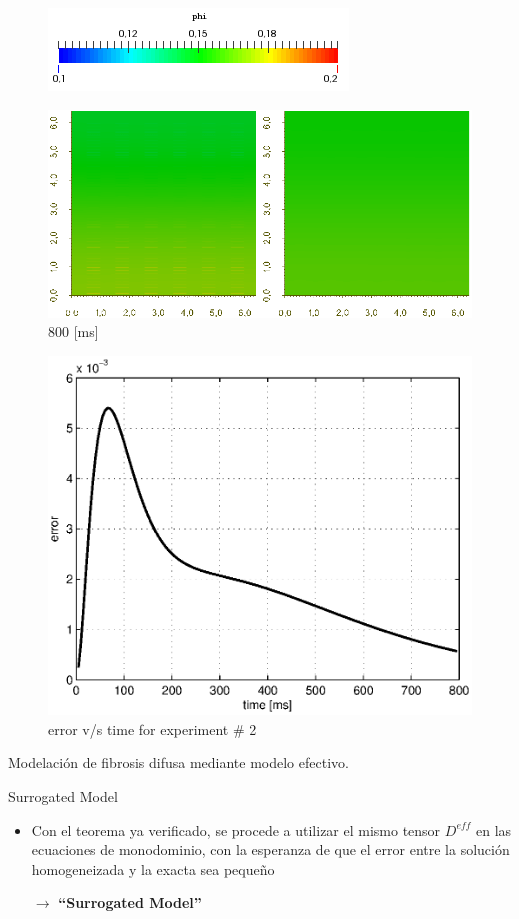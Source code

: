 \documentclass[11pt,spanish]{beamer}
\begin{document}
\begin{frame}
\begin{figure}[H]
\centering
\includegraphics[height = 0.9 cm]{fig/theorem_verification_r2_exp2_colorbar}
\end{figure}
\begin{figure}[H]
\centering
\includegraphics[height = 5 cm]{fig/theorem_verification_r2_exp2_800ms}
\caption{800 [ms]}
\end{figure}
\end{frame}

\begin{frame}
\begin{figure}[H]
\centering
\includegraphics[height = 6 cm]{fig/theorem_verification_r2_exp2_error}
\caption{error v/s time for experiment \# 2}
\end{figure}
\end{frame}

\begin{frame}
\begin{center}
\Huge Modelación de fibrosis difusa mediante modelo efectivo.
\end{center}
\end{frame}

\begin{frame}{Surrogated Model}
\begin{itemize}
\item Con el teorema ya verificado, se procede a utilizar el mismo tensor $D^{eff}$ en las ecuaciones de monodominio, con la esperanza de que el error entre la solución homogeneizada y la exacta sea pequeño \\
\begin{center}
\pause $\rightarrow$ \textbf{``Surrogated Model''}
\end{center} 
\end{itemize}
\end{frame}
\end{document}
